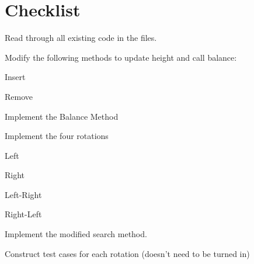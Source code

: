 \documentclass[a4paper]{article}
\begin{document}
\section{Checklist}
\begin{todolist}
    \item Read through all existing code in the files.
    \item Modify the following methods to update height and call balance:
    \begin{todolist}
        \item Insert
        \item Remove
    \end{todolist}
    \item Implement the Balance Method
    \item Implement the four rotations
    \begin{todolist}
        \item Left
        \item Right
        \item Left-Right
        \item Right-Left
    \end{todolist}
    \item Implement the modified search method.
	\item Construct test cases for each rotation (doesn't need to be turned in)
\end{todolist}
\end{document}
